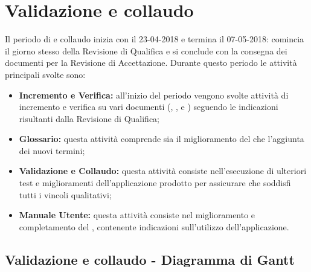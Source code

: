 \documentclass[PianoDiProgetto.tex]{subfiles}
\begin{document}
\section{Validazione e collaudo}
Il periodo di  e collaudo inizia con il 23-04-2018 e termina il 07-05-2018: comincia il giorno stesso della Revisione di Qualifica e si conclude con la consegna dei documenti per la Revisione di Accettazione. Durante questo periodo le attività principali svolte sono:
\begin{itemize}
\item \textbf{Incremento e Verifica:} all'inizio del periodo vengono svolte attività di incremento e verifica su vari documenti (\ndp, \pdp, \pdq e \pb) seguendo le indicazioni risultanti dalla Revisione di Qualifica;
\item \textbf{Glossario:} questa attività comprende sia il miglioramento del \g che l'aggiunta dei nuovi termini;
\item \textbf{Validazione e Collaudo:} questa attività consiste nell'esecuzione di ulteriori test e miglioramenti dell'applicazione prodotto per assicurare che soddisfi tutti i vincoli qualitativi;
\item \textbf{Manuale Utente:} questa attività consiste nel miglioramento e completamento del \mut, contenente indicazioni sull'utilizzo dell'applicazione.

\end{itemize}
\begin{landscape}
\subsection{Validazione e collaudo - Diagramma di Gantt}
\end{landscape}	
\end{document}
